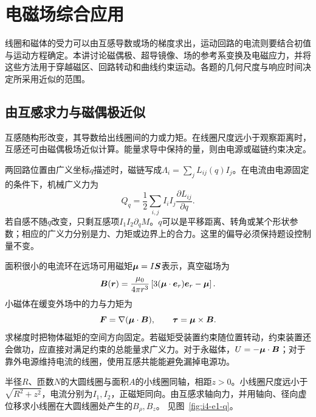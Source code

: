 \chapter{电磁场综合应用}
线圈和磁体的受力可以由互感导数或场的梯度求出，运动回路的电流则要结合初值与运动方程确定。本讲讨论磁偶极、超导镜像、场的参考系变换及电磁应力，并将这些方法用于穿越磁区、回路转动和曲线约束运动。各题的几何尺度与响应时间决定所采用近似的范围。



\section{由互感求力与磁偶极近似}\label{sec:i4-force}
互感随构形改变，其导数给出线圈间的力或力矩。在线圈尺度远小于观察距离时，互感还可由磁偶极场近似计算。能量求导中保持的量，则由电源或磁链约束决定。

两回路位置由广义坐标$q$描述时，磁链写成$\Lambda_i=\sum_jL_{ij}(q)I_j$。在电流由电源固定的条件下，机械广义力为
\[
Q_q=\frac12\sum_{i,j}I_iI_j\frac{\partial L_{ij}}{\partial q}.
\]
若自感不随$q$改变，只剩互感项$I_1I_2\partial_qM$。$q$可以是平移距离、转角或某个形状参数；相应的广义力分别是力、力矩或边界上的合力。这里的偏导必须保持题设控制量不变。

面积很小的电流环在远场可用磁矩$\bm{\mu}=I\bm{S}$表示，真空磁场为
\[
\bm{B}(\bm{r})=\frac{\mu_0}{4\pi r^3}
\left[3(\bm{\mu}\cdot\bm{e}_r)\bm{e}_r-\bm{\mu}\right].
\]
小磁体在缓变外场中的力与力矩为
\[
\bm{F}=\nabla(\bm{\mu}\cdot\bm{B}),\qquad
\bm{\tau}=\bm{\mu}\times\bm{B}.
\]
求梯度时把物体磁矩的空间方向固定。若磁矩受装置约束随位置转动，约束装置还会做功，应直接对满足约束的总能量求广义力。对于永磁体，$U=-\bm{\mu}\cdot\bm{B}$；对于靠外电源维持电流的线圈，使用互感共能能避免漏掉电源功。


\begin{example}[用两个虚位移求偶极场]\label{ex:i4-e1}

半径$R$、匝数$N$的大圆线圈与面积$A$的小线圈同轴，相距$z>0$。小线圈尺度远小于$\sqrt{R^2+z^2}$，电流分别为$I_1,I_2$，正磁矩同向。由互感求轴向力，并用轴向、径向虚位移求小线圈在大圆线圈处产生的$B_\rho,B_z$。
 见图~\ref{fig:i4-e1-q}。
\end{example}

